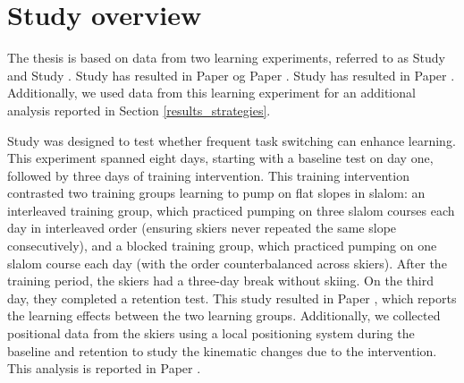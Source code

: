 \newcommand{\RNum}[1]{\uppercase\expandafter{\romannumeral #1\relax}}

\section{Study overview}
The thesis is based on data from two learning experiments, referred to as Study \RNum{1}  and Study \RNum{2}. Study \RNum{1} has resulted in Paper \RNum{1} og Paper \RNum{2}. Study \RNum{2} has resulted in Paper \RNum{3}. Additionally, we used data from this learning experiment for an additional analysis reported in Section \ref{results_strategies}.

Study \RNum{1} was designed to test whether frequent task switching can enhance learning. This experiment spanned eight days, starting with a baseline test on day one, followed by three days of training intervention. This training intervention contrasted two training groups learning to pump on flat slopes in slalom: an interleaved training group, which practiced pumping on three slalom courses each day in interleaved order (ensuring skiers never repeated the same slope consecutively), and a blocked training group, which practiced pumping on one slalom course each day (with the order counterbalanced across skiers). After the training period, the skiers had a three-day break without skiing. On the third day, they completed a retention test. This study resulted in Paper \RNum{1}, which reports the learning effects between the two learning groups. Additionally, we collected positional data from the skiers using a local positioning system during the baseline and retention to study the kinematic changes due to the intervention. This analysis is reported in Paper \RNum{2}. 

